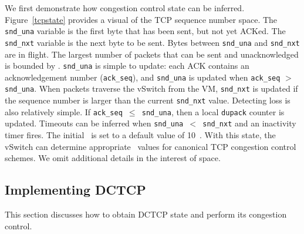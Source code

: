 We first demonstrate how congestion control state can be inferred.
Figure~\ref{tcpstate} provides a visual of the TCP sequence number space. The {\tt snd\_una} variable is the first byte
that has been sent, but not yet ACKed. The {\tt snd\_nxt} variable is the 
next byte to be sent. Bytes between {\tt snd\_una} and {\tt snd\_nxt} are in flight.
The largest number of packets that can be sent and unacknowledged is bounded by \cwnd{}.
{\tt snd\_una} is simple to update: each ACK contains an acknowledgement number ({\tt ack\_seq}), and 
{\tt snd\_una} is updated when {\tt ack\_seq} $>$ {\tt snd\_una}.
When packets traverse the vSwitch from the VM, {\tt snd\_nxt} is updated if the sequence
number is larger than the current {\tt snd\_nxt} value.
Detecting loss is also relatively simple. If {\tt ack\_seq $\le$ snd\_una}, then
a local {\tt dupack} counter is updated. Timeouts can be inferred when {\tt snd\_una $<$ snd\_nxt}
and an inactivity timer fires. The initial~\cwnd{} is set to a default value of 10~\cite{RFC6928}. 
With this state, the vSwitch can determine appropriate~\cwnd{} values for canonical
TCP congestion control schemes.
We omit additional details in the interest of space. 



\subsection{Implementing DCTCP}


This section discusses how to obtain DCTCP state and perform its congestion control.


